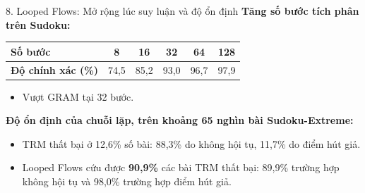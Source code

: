 \begin{frame}{8. Looped Flows: Mở rộng lúc suy luận và độ ổn định}
    \textbf{Tăng số bước tích phân trên Sudoku:}
    \begin{center}
        \small
        \begin{tabular}{lccccc}
            \toprule
            \textbf{Số bước} & 8 & 16 & 32 & 64 & 128 \\
            \midrule
            \textbf{Độ chính xác (\%)} & 74,5 & 85,2 & 93,0 & 96,7 & 97,9 \\
            \bottomrule
        \end{tabular}
    \end{center}
    \begin{itemize}
        \item Vượt GRAM tại 32 bước.
    \end{itemize}
    \vspace{0.1cm}
    \textbf{Độ ổn định của chuỗi lặp, trên khoảng 65 nghìn bài Sudoku-Extreme:}
    \begin{itemize}
        \item TRM thất bại ở 12,6\% số bài: 88,3\% do không hội tụ, 11,7\% do điểm hút giả.
        \item Looped Flows cứu được \textbf{90,9\%} các bài TRM thất bại: 89,9\% trường hợp không hội tụ và 98,0\% trường hợp điểm hút giả.
    \end{itemize}
\end{frame}

